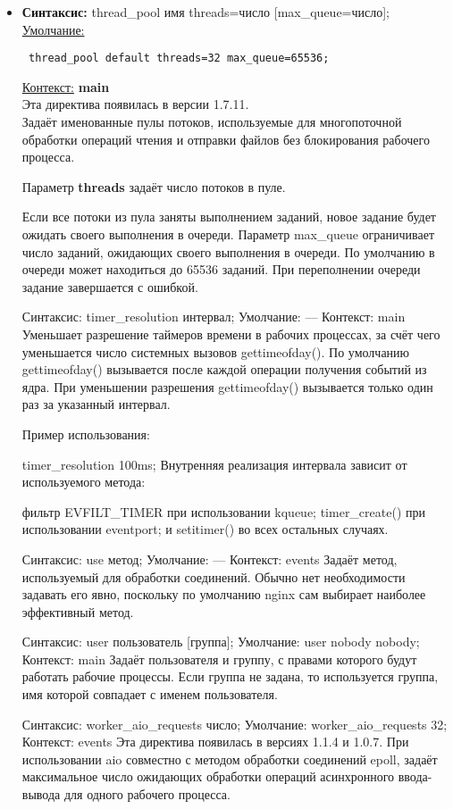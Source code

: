 \documentclass[a4paper,10pt,twoside]{article}
\begin{document}
\begin{itemize}
\item \textbf{Синтаксис:} thread\_pool имя threads=число [max\_queue=число];\\
\underline{Умолчание:}
\begin{verbatim}
 thread_pool default threads=32 max_queue=65536;
\end{verbatim} 
\underline{Контекст:} \textbf{main}\\
Эта директива появилась в версии 1.7.11.\\
Задаёт именованные пулы потоков, используемые для многопоточной обработки операций чтения и отправки файлов без блокирования рабочего процесса.

Параметр \textbf{threads} задаёт число потоков в пуле.

Если все потоки из пула заняты выполнением заданий, новое задание будет ожидать своего выполнения в очереди. Параметр max\_queue ограничивает число заданий, ожидающих своего выполнения в очереди. По умолчанию в очереди может находиться до 65536 заданий. При переполнении очереди задание завершается с ошибкой.

Синтаксис:	timer_resolution интервал;
Умолчание:	—
Контекст:	main
Уменьшает разрешение таймеров времени в рабочих процессах, за счёт чего уменьшается число системных вызовов gettimeofday(). По умолчанию gettimeofday() вызывается после каждой операции получения событий из ядра. При уменьшении разрешения gettimeofday() вызывается только один раз за указанный интервал.

Пример использования:

timer_resolution 100ms;
Внутренняя реализация интервала зависит от используемого метода:

фильтр EVFILT_TIMER при использовании kqueue;
timer_create() при использовании eventport;
и setitimer() во всех остальных случаях.

Синтаксис:	use метод;
Умолчание:	—
Контекст:	events
Задаёт метод, используемый для обработки соединений. Обычно нет необходимости задавать его явно, поскольку по умолчанию nginx сам выбирает наиболее эффективный метод.

Синтаксис:	user пользователь [группа];
Умолчание:	
user nobody nobody;
Контекст:	main
Задаёт пользователя и группу, с правами которого будут работать рабочие процессы. Если группа не задана, то используется группа, имя которой совпадает с именем пользователя.

Синтаксис:	worker_aio_requests число;
Умолчание:	
worker_aio_requests 32;
Контекст:	events
Эта директива появилась в версиях 1.1.4 и 1.0.7.
При использовании aio совместно с методом обработки соединений epoll, задаёт максимальное число ожидающих обработки операций асинхронного ввода-вывода для одного рабочего процесса.


\end{itemize}
\end{document}
